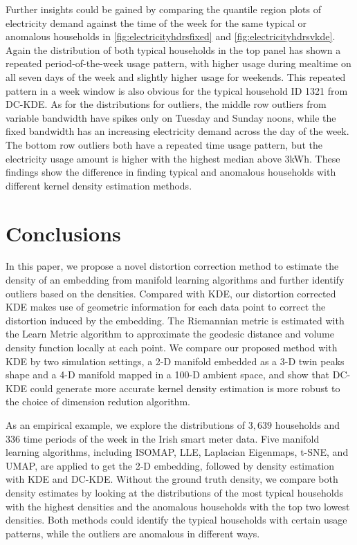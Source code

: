 \documentclass[11pt,a4paper,]{article}
\begin{document}
Further insights could be gained by comparing the quantile region plots of electricity demand against the time of the week for the same typical or anomalous households in \autoref{fig:electricityhdrsfixed} and \autoref{fig:electricityhdrsvkde}. Again the distribution of both typical households in the top panel has shown a repeated period-of-the-week usage pattern, with higher usage during mealtime on all seven days of the week and slightly higher usage for weekends.
This repeated pattern in a week window is also obvious for the typical household ID 1321 from DC-KDE. As for the distributions for outliers, the middle row outliers from variable bandwidth have spikes only on Tuesday and Sunday noons, while the fixed bandwidth has an increasing electricity demand across the day of the week. The bottom row outliers both have a repeated time usage pattern, but the electricity usage amount is higher with the highest median above 3kWh. These findings show the difference in finding typical and anomalous households with different kernel density estimation methods.

\hypertarget{conclusion}{%
\section{Conclusions}\label{conclusion}}

In this paper, we propose a novel distortion correction method to estimate the density of an embedding from manifold learning algorithms and further identify outliers based on the densities. Compared with KDE, our distortion corrected KDE makes use of geometric information for each data point to correct the distortion induced by the embedding. The Riemannian metric is estimated with the Learn Metric algorithm to approximate the geodesic distance and volume density function locally at each point. We compare our proposed method with KDE by two simulation settings, a 2-D manifold embedded as a 3-D twin peaks shape and a 4-D manifold mapped in a 100-D ambient space, and show that DC-KDE could generate more accurate kernel density estimation is more robust to the choice of dimension redution algorithm.

As an empirical example, we explore the distributions of \(3,639\) households and \(336\) time periods of the week in the Irish smart meter data. Five manifold learning algorithms, including ISOMAP, LLE, Laplacian Eigenmaps, t-SNE, and UMAP, are applied to get the 2-D embedding, followed by density estimation with KDE and DC-KDE. Without the ground truth density, we compare both density estimates by looking at the distributions of the most typical households with the highest densities and the anomalous households with the top two lowest densities. Both methods could identify the typical households with certain usage patterns, while the outliers are anomalous in different ways.
\end{document}
